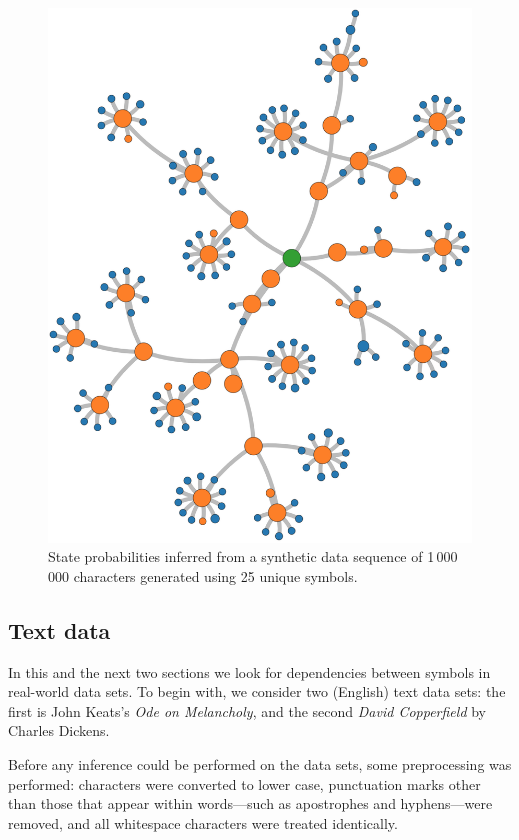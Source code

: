 \documentclass[12pt,a4paper]{article}
\begin{document}
\begin{figure}[htbp]
  \includegraphics[width=\textwidth]{figures/synthetic 3}
\caption{State probabilities inferred from a synthetic data sequence of
  1\,000\,000 characters generated using 25 unique symbols.}
\label{fig:25-character model 2}
\end{figure}

\subsection{Text data}\label{sec:text} %

In this and the next two sections we look for dependencies between symbols in
real-world data sets. To begin with, we consider two (English) text data sets:
the first is John Keats's \textit{Ode on Melancholy}, and the second
\textit{David Copperfield} by Charles Dickens.

Before any inference could be performed on the data sets, some preprocessing was
performed: characters were converted to lower case, punctuation marks other than
those that appear within words---such as apostrophes and hyphens---were removed,
and all whitespace characters were treated identically.
\end{document}
